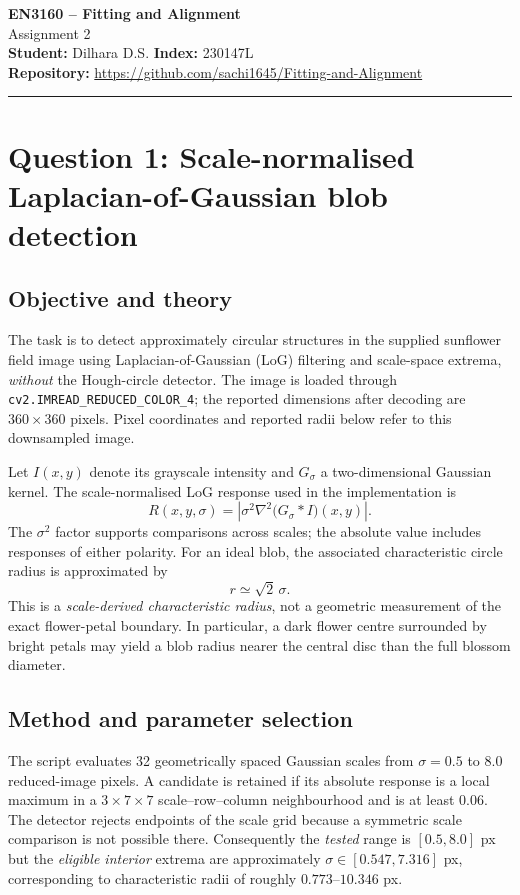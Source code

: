 \documentclass[11pt,a4paper]{article}
\begin{document}
\begin{center}
{\LARGE\bfseries\color{navy}EN3160 -- Fitting and Alignment}\\[5pt]
{\Large Assignment 2}\\[7pt]
\textbf{Student:} Dilhara D.S. \quad \textbf{Index:} 230147L\\
\textbf{Repository:} \url{https://github.com/sachi1645/Fitting-and-Alignment}
\end{center}
\hrule\vspace{9pt}


\section{Question 1: Scale-normalised Laplacian-of-Gaussian blob detection}
\subsection{Objective and theory}
The task is to detect approximately circular structures in the supplied sunflower field image using Laplacian-of-Gaussian (LoG) filtering and scale-space extrema, \emph{without} the Hough-circle detector. The image is loaded through \texttt{cv2.IMREAD\_REDUCED\_COLOR\_4}; the reported dimensions after decoding are $360\times360$ pixels. Pixel coordinates and reported radii below refer to this downsampled image.

Let $I(x,y)$ denote its grayscale intensity and $G_\sigma$ a two-dimensional Gaussian kernel. The scale-normalised LoG response used in the implementation is
\begin{equation}
R(x,y,\sigma)=\left|\sigma^{2}\nabla^{2}\bigl(G_{\sigma}*I\bigr)(x,y)\right|.
\label{eq:log}
\end{equation}
The $\sigma^{2}$ factor supports comparisons across scales; the absolute value includes responses of either polarity. For an ideal blob, the associated characteristic circle radius is approximated by
\begin{equation}
  r\simeq\sqrt{2}\,\sigma.
\label{eq:blob_radius}
\end{equation}
This is a \emph{scale-derived characteristic radius}, not a geometric measurement of the exact flower-petal boundary. In particular, a dark flower centre surrounded by bright petals may yield a blob radius nearer the central disc than the full blossom diameter.

\subsection{Method and parameter selection}
The script evaluates 32 geometrically spaced Gaussian scales from $\sigma=0.5$ to $8.0$ reduced-image pixels. A candidate is retained if its absolute response is a local maximum in a $3\times7\times7$ scale--row--column neighbourhood and is at least $0.06$. The detector rejects endpoints of the scale grid because a symmetric scale comparison is not possible there. Consequently the \emph{tested} range is $[0.5,8.0]$ px but the \emph{eligible interior} extrema are approximately $\sigma\in[0.547,7.316]$ px, corresponding to characteristic radii of roughly $0.773$--$10.346$ px.
\end{document}
